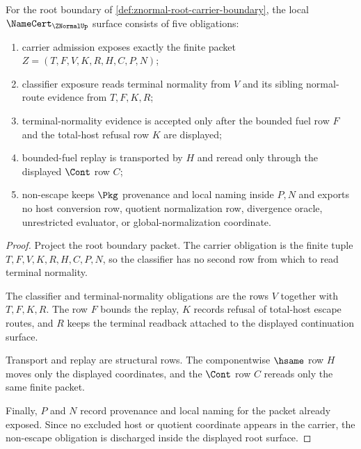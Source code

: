 \begin{theorem}
\label{thm:znormal-namecert-root-obligations}
For the root boundary of \autoref{def:znormal-root-carrier-boundary}, the local $\NameCert_{\ZNormalUp}$ surface consists of five obligations:
\begin{enumerate}
\item carrier admission exposes exactly the finite packet $Z=(T,F,V,K,R,H,C,P,N)$;
\item classifier exposure reads terminal normality from $V$ and its sibling normal-route evidence from $T,F,K,R$;
\item terminal-normality evidence is accepted only after the bounded fuel row $F$ and the total-host refusal row $K$ are displayed;
\item bounded-fuel replay is transported by $H$ and reread only through the displayed $\Cont$ row $C$;
\item non-escape keeps $\Pkg$ provenance and local naming inside $P,N$ and exports no host conversion row, quotient normalization row, divergence oracle, unrestricted evaluator, or global-normalization coordinate.
\end{enumerate}
\end{theorem}
\begin{proof}
Project the root boundary packet. The carrier obligation is the finite tuple $T,F,V,K,R,H,C,P,N$, so the classifier has no second row from which to read terminal normality.

The classifier and terminal-normality obligations are the rows $V$ together with $T,F,K,R$. The row $F$ bounds the replay, $K$ records refusal of total-host escape routes, and $R$ keeps the terminal readback attached to the displayed continuation surface.

Transport and replay are structural rows. The componentwise $\hsame$ row $H$ moves only the displayed coordinates, and the $\Cont$ row $C$ rereads only the same finite packet.

Finally, $P$ and $N$ record provenance and local naming for the packet already exposed. Since no excluded host or quotient coordinate appears in the carrier, the non-escape obligation is discharged inside the displayed root surface.
\end{proof}

